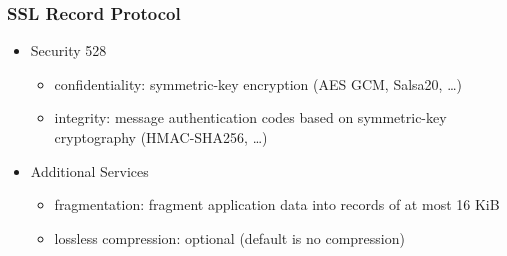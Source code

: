 \documentclass[final]{article}
\begin{document}
\subsubsection*{SSL Record Protocol}
\begin{itemize}[nosep]
    \item Security 528
          \begin{itemize}[nosep]
              \item confidentiality: symmetric-key encryption (AES GCM, Salsa20, \dots)
              \item integrity: message authentication codes based on symmetric-key cryptography (HMAC-SHA256, \dots)
          \end{itemize}
    \item Additional Services
          \begin{itemize}[nosep]
              \item fragmentation: fragment application data into records of at most 16 KiB
              \item lossless compression: optional (default is no compression)
          \end{itemize}
\end{itemize}
\end{document}
